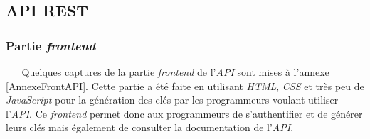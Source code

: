 \subsection{API REST}
\subsubsection{Partie \textit{frontend}}
$ _{} $ $ _{} $ $ _{} $ $ _{} $ $ _{} $Quelques captures de la partie \textit{frontend} de l'\textit{API} sont mises à l'annexe \ref{AnnexeFrontAPI}. Cette partie a été faite en utilisant \textit{HTML}, \textit{CSS} et très peu de \textit{JavaScript} pour la génération des clés par les programmeurs voulant utiliser l'\textit{API}. Ce \textit{frontend} permet donc aux programmeurs de s'authentifier et de générer leurs clés mais également de consulter la documentation de l'\textit{API}. 
